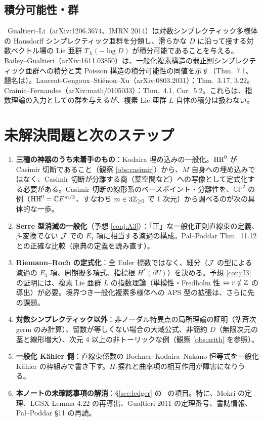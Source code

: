 \subsection{積分可能性・群}
\tC\ Gualtieri--Li（arXiv:1206.3674、IMRN 2014）は対数シンプレクティック多様体の Hausdorff シンプレクティック亜群を分類し、滑らかな $D$ に沿って接する対数ベクトル場の Lie 亜群 $T_X(-\log D)$ が積分可能であることを与える。Bailey--Gualtieri（arXiv:1611.03850）は、一般化複素構造の弱正則シンプレクティック亜群への積分と実 Poisson 構造の積分可能性の同値を示す（Thm.\ 7.1、題名は\tQ）。Laurent-Gengoux--Stiénon--Xu（arXiv:0803.2031）：Thm.\ 3.17, 3.22。Crainic--Fernandes（arXiv:math/0105033）：Thm.\ 4.1, Cor.\ 5.2。これらは、指数理論の入力としての群を与えるが、複素 Lie 亜群 $L$ 自体の積分は扱わない。

\section{未解決問題と次のステップ}\label{sec:open}
\begin{enumerate}
\item \textbf{三種の神器のうち未着手のもの}：Kodaira 埋め込みの一般化。$\mathrm{HH}^0$ が Casimir 切断であること（観察 \ref{obs:casimir}）から、$M$ 自身への埋め込みではなく、Casimir 切断が分離する商（葉空間など）への写像として定式化する必要がある。Casimir 切断の線形系のベースポイント・分離性を、$\mathbb{CP}^2$ の例（$\mathrm{HH}^0=\mathbb C F^{m/3}$、すなわち $m\in3\mathbb Z_{\ge0}$ で 1 次元）から調べるのが次の具体的な一歩。
\item \textbf{Serre 型消滅の一般化}（予想 \ref{conj:A3}）：「正」な一般化正則直線束の定義、$\beta$-変換でない $\mathcal J$ での $E_1$ 項に相当する濾過の構成。Pal--Poddar Thm.\ 11.12 との正確な比較（原典の定義を読み直す）。
\item \textbf{Riemann--Roch の定式化}：全 Euler 標数ではなく、細分（$\mathcal J$ の型による濾過の $E_1$ 項、周期擬多項式、指標根 $H^*(\partial U)$）を決める。予想 \ref{conj:I3} の証明には、複素 Lie 亜群 $L$ の指数理論（単模性・Fredholm 性 $\Leftrightarrow r\notin\mathbb Z$ の導出）が必要。境界つき一般化複素多様体への APS 型の拡張は、さらに先の課題。
\item \textbf{対数シンプレクティック以外}：非ノーダル特異点の局所理論の証明（準斉次 germ のみ計算）、留数が等しくない場合の大域公式、非簡約 $D$（無限次元の茎と線形増大）、次元 4 以上の非トーリックな例（観察 \ref{obs:arith} を参照）。
\item \textbf{一般化 Kähler 側}：直線束係数の Bochner--Kodaira--Nakano 恒等式を一般化 Kähler の枠組みで書き下す。$H$-捩れと曲率項の相互作用が障害になりうる\tK。
\item \textbf{本ノートの未確認事項の解消}：\S\ref{sec:ledger} の \tQ\ の項目。特に、Mokri の定理、LGSX Lemma 4.22 の再導出、Gualtieri 2011 の定理番号、書誌情報、Pal--Poddar \S11 の再読。
\end{enumerate}

